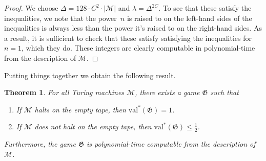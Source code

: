 \documentclass[11pt]{article}
\newtheorem{theorem}{Theorem}[section]
\theoremstyle{definition}
\newcommand{\val}{\ensuremath{\mathrm{val}}}
\newcommand{\game}{\mathfrak{G}}
\newcommand{\machine}{\cal{M}}
\renewcommand{\cal}[1]{\mathcal{#1}}
\begin{document}
\begin{proof}
We choose $\Delta = 128 \cdot C^2 \cdot |\cal{M}|$ and $\lambda = \Delta^{2C}$.
To see that these satisfy the inequalities, we note that the power~$n$ is raised
to on the left-hand sides of the inequalities is always less than the power it's
raised to on the right-hand sides.
As a result, it is sufficient to check that these satisfy satisfying the
inequalities for $n = 1$, which they do.
These integers are clearly computable in polynomial-time from the description of
$\cal{M}$.
\end{proof}

Putting things together we obtain the following result. 

\begin{theorem}
  \label{thm:halting}
	For all Turing machines $\machine$, there exists a game $\game$ such that
	\begin{enumerate}
  \item If $\machine$ halts on the empty tape, then $\val^*(\game) = 1$.
  \item If $\machine$ does not halt on the empty tape, then $\val^*(\game) \leq
    \frac{1}{2}$.
	\end{enumerate}
	Furthermore, the game $\game$ is polynomial-time computable from the
  description of $\machine$.
\end{theorem}
\end{document}
